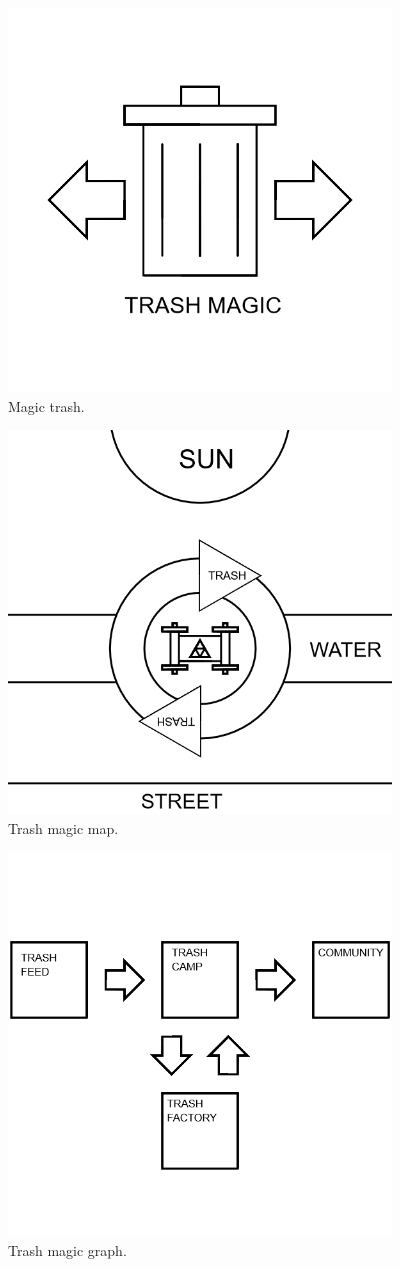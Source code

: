 \begin{figure}
	\centering
	\includegraphics[width=4in]{imageserver/uploadimages/image13.png}
	\caption{Magic trash.}
\end{figure}

\begin{figure}
	\centering
	\includegraphics[width=4in]{imageserver/uploadimages/image14.png}
	\caption{Trash magic map.}
\end{figure}

\begin{figure}
	\centering
	\includegraphics[width=4in]{imageserver/uploadimages/image15.png}
	\caption{Trash magic graph.}
\end{figure}


